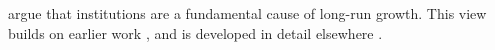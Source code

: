 \documentclass[11pt]{article}
\begin{document}
\citet{acemoglu2012} argue that institutions are a fundamental cause
of long-run growth. This view builds on earlier work
\citep{halljones1999}, and is developed in detail elsewhere
\citep[see][chap.~2]{acemoglu2012}.

\end{document}

